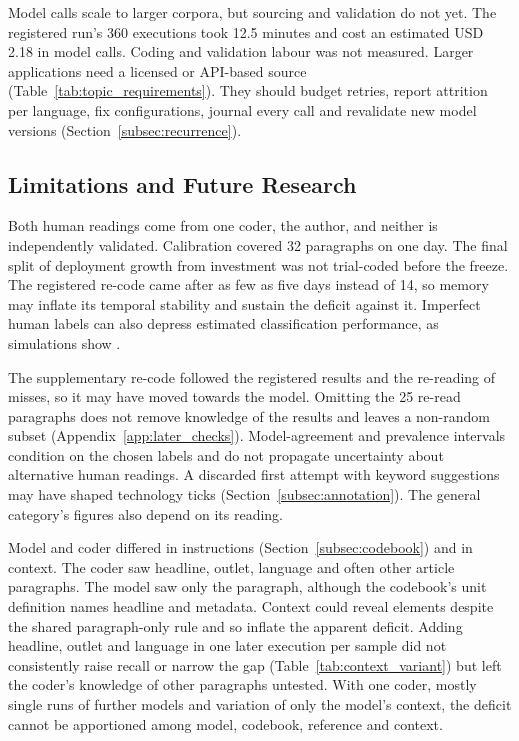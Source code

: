 Model calls scale to larger corpora, but sourcing and validation do not yet. The registered run's 360 executions took 12.5 minutes and cost an estimated USD 2.18 in model calls. Coding and validation labour was not measured. Larger applications need a licensed or API-based source (Table~\ref{tab:topic_requirements}). They should budget retries, report attrition per language, fix configurations, journal every call and revalidate new model versions (Section~\ref{subsec:recurrence}).

\subsection{Limitations and Future Research}\label{subsec:limitations_future}\label{subsec:limitations}

Both human readings come from one coder, the author, and neither is independently validated. Calibration covered 32 paragraphs on one day. The final split of deployment growth from investment was not trial-coded before the freeze. The registered re-code came after as few as five days instead of 14, so memory may inflate its temporal stability and sustain the deficit against it. Imperfect human labels can also depress estimated classification performance, as simulations show \parencite[p.~560]{song2020validations}.

The supplementary re-code followed the registered results and the re-reading of misses, so it may have moved towards the model. Omitting the 25 re-read paragraphs does not remove knowledge of the results and leaves a non-random subset (Appendix~\ref{app:later_checks}). Model-agreement and prevalence intervals condition on the chosen labels and do not propagate uncertainty about alternative human readings. A discarded first attempt with keyword suggestions may have shaped technology ticks (Section~\ref{subsec:annotation}). The general category's figures also depend on its reading.

Model and coder differed in instructions (Section~\ref{subsec:codebook}) and in context. The coder saw headline, outlet, language and often other article paragraphs. The model saw only the paragraph, although the codebook's unit definition names headline and metadata. Context could reveal elements despite the shared paragraph-only rule and so inflate the apparent deficit. Adding headline, outlet and language in one later execution per sample did not consistently raise recall or narrow the gap (Table~\ref{tab:context_variant}) but left the coder's knowledge of other paragraphs untested. With one coder, mostly single runs of further models and variation of only the model's context, the deficit cannot be apportioned among model, codebook, reference and context.

